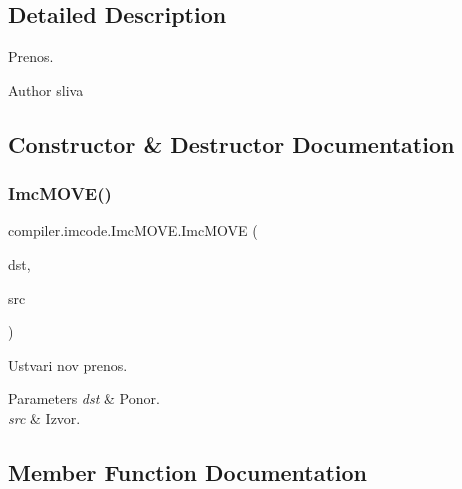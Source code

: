\subsection{Detailed Description}
Prenos.

\begin{DoxyAuthor}{Author}
sliva 
\end{DoxyAuthor}


\subsection{Constructor \& Destructor Documentation}
\mbox{\label{classcompiler_1_1imcode_1_1_imc_m_o_v_e_aa5f288629e76da6d228d7f2065266043}} 
\subsubsection{\texorpdfstring{Imc\+M\+O\+V\+E()}{ImcMOVE()}}
{\footnotesize\ttfamily compiler.\+imcode.\+Imc\+M\+O\+V\+E.\+Imc\+M\+O\+VE (\begin{DoxyParamCaption}\item[{\hyperlink{classcompiler_1_1imcode_1_1_imc_expr}{Imc\+Expr}}]{dst,  }\item[{\hyperlink{classcompiler_1_1imcode_1_1_imc_expr}{Imc\+Expr}}]{src }\end{DoxyParamCaption})}

Ustvari nov prenos.


\begin{DoxyParams}{Parameters}
{\em dst} & Ponor. \\
\hline
{\em src} & Izvor. \\
\hline
\end{DoxyParams}


\subsection{Member Function Documentation}
\mbox{\label{classcompiler_1_1imcode_1_1_imc_m_o_v_e_a3ffea72b3490bb79245f8c9a311cd4e4}} 
